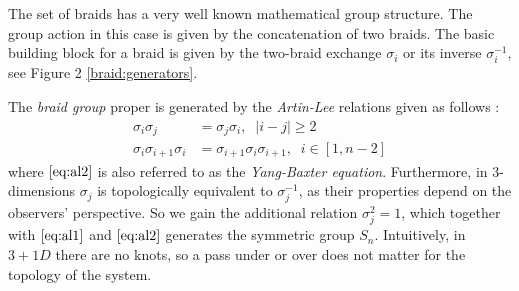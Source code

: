 \documentclass{article}
\begin{document}
  










The set of braids has a very well known mathematical group structure. The group action in this case is given by the concatenation of two braids. The basic building block for a braid is given by the two-braid exchange $\sigma_i$ or its inverse $\sigma_i^{-1}$, see Figure 2 \cref{braid:generators}.

\newpage

The {\it braid group} proper is generated by the {\it Artin-Lee} relations given as follows \cite{artin_theory_1950} \cite{fox_braid_1962}:
\begin{align}
  \sigma_i\sigma_j &= \sigma_j\sigma_i, \;\; \left\vert i - j \right\vert \geq 2 \label{eq:al1}\\
  \sigma_i\sigma_{i+1}\sigma_{i} &= \sigma_{i+1}\sigma_i\sigma_{i+1}, \;\; i \in [1,n-2] \label{eq:al2}
\end{align}\label{eq:artin}
where $\eqref{eq:al2}$ is also referred to as the {\it Yang-Baxter equation}. Furthermore, in $3$-dimensions $\sigma_j$ is topologically equivalent to $\sigma_j^{-1}$, as their properties depend on the observers' perspective. So we gain the additional relation $\sigma_j^2 = 1$, which together with $\eqref{eq:al1}$ and $\eqref{eq:al2}$ generates the symmetric group $S_n$. Intuitively, in $3 + 1D$ there are no knots, so a pass under or over does not matter for the topology of the system.


\vspace{0.5cm}
\end{document}
